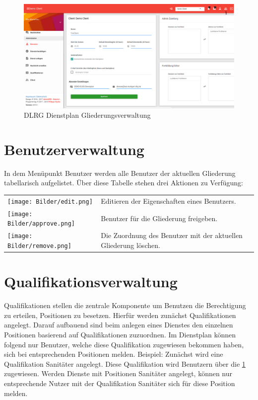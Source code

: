 \begin{figure}[h]
	\begin{addmargin}{-0.2\linewidth}
		\centering 
		\includegraphics[width=20cm]{Bilder/view_admin.png}
	\end{addmargin} 
	\caption[Gliederungsverwaltung]{DLRG Dienstplan Gliederungsverwaltung}
	\label{fig:view_client}
\end{figure}

\section{Benutzerverwaltung}
\label{sec:admin_benutzerverwaltung}
In dem Menüpunkt Benutzer werden alle Benutzer der aktuellen Gliederung tabellarisch aufgelistet. Über diese Tabelle stehen drei Aktionen zu Verfügung:

\begin{table}[H]
	\centering
	\begin{tabular}{ll}
		\texttt{[image: Bilder/edit.png]} & Editieren der Eigenschaften eines Benutzers. \\[10pt]
		\texttt{[image: Bilder/approve.png]}	& Benutzer für die Gliederung freigeben. \\[10pt]
		\texttt{[image: Bilder/remove.png]} & Die Zuordnung des Benutzer mit der aktuellen Gliederung löschen. \\
	\end{tabular}
\end{table}

\section{Qualifikationsverwaltung}
\label{sec:admin_qualifikationsverwaltung}
Qualifikationen stellen die zentrale Komponente um Benutzen die Berechtigung zu erteilen, Positionen zu besetzen. Hierfür werden zunächst Qualifikationen angelegt. Darauf aufbauend sind beim anlegen eines Dienstes den einzelnen Positionen basierend auf Qualifikationen zuzuordnen. Im Dienstplan können folgend nur Benutzer, welche diese Qualifikation zugewiesen bekommen haben, sich bei entsprechenden Positionen melden. Beispiel: Zunächst wird eine Qualifikation Sanitäter angelegt. Diese Qualifikation wird Benutzern über die \ref{sec:admin_benutzerverwaltung}  zugewiesen. Werden Dienste mit Positionen \glqq Sanitäter\grqq{} angelegt, können nur entsprechende Nutzer mit der Qualifikation \glqq Sanitäter\grqq{} sich für diese Position melden.

